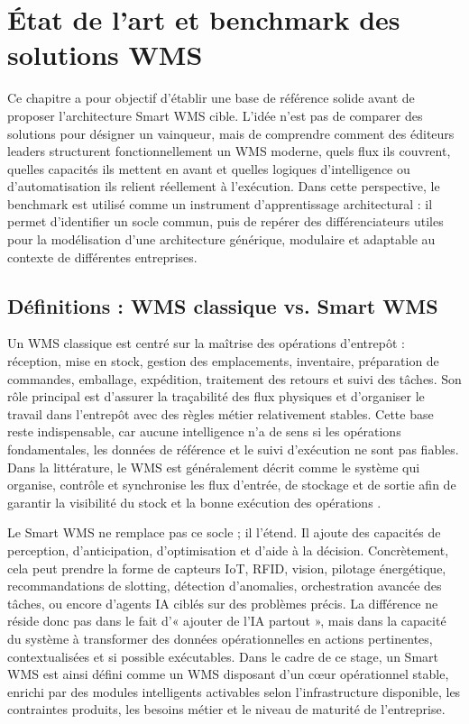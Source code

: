 \chapter{État de l’art et benchmark des solutions WMS}

\label{chap:2}

Ce chapitre a pour objectif d’établir une base de référence solide avant de proposer l’architecture Smart WMS cible. L’idée n’est pas de comparer des solutions pour désigner un vainqueur, mais de comprendre comment des éditeurs leaders structurent fonctionnellement un WMS moderne, quels flux ils couvrent, quelles capacités ils mettent en avant et quelles logiques d’intelligence ou d’automatisation ils relient réellement à l’exécution. Dans cette perspective, le benchmark est utilisé comme un instrument d’apprentissage architectural : il permet d’identifier un socle commun, puis de repérer des différenciateurs utiles pour la modélisation d’une architecture générique, modulaire et adaptable au contexte de différentes entreprises.



\section{Définitions : WMS classique vs. Smart WMS}

\label{sec:2.1}

Un WMS classique est centré sur la maîtrise des opérations d’entrepôt : réception, mise en stock, gestion des emplacements, inventaire, préparation de commandes, emballage, expédition, traitement des retours et suivi des tâches. Son rôle principal est d’assurer la traçabilité des flux physiques et d’organiser le travail dans l’entrepôt avec des règles métier relativement stables. Cette base reste indispensable, car aucune intelligence n’a de sens si les opérations fondamentales, les données de référence et le suivi d’exécution ne sont pas fiables. Dans la littérature, le WMS est généralement décrit comme le système qui organise, contrôle et synchronise les flux d’entrée, de stockage et de sortie afin de garantir la visibilité du stock et la bonne exécution des opérations \cite{ref3}.


Le Smart WMS ne remplace pas ce socle ; il l’étend. Il ajoute des capacités de perception, d’anticipation, d’optimisation et d’aide à la décision. Concrètement, cela peut prendre la forme de capteurs IoT, RFID, vision, pilotage énergétique, recommandations de slotting, détection d’anomalies, orchestration avancée des tâches, ou encore d’agents IA ciblés sur des problèmes précis. La différence ne réside donc pas dans le fait d’« ajouter de l’IA partout », mais dans la capacité du système à transformer des données opérationnelles en actions pertinentes, contextualisées et si possible exécutables. Dans le cadre de ce stage, un Smart WMS est ainsi défini comme un WMS disposant d’un cœur opérationnel stable, enrichi par des modules intelligents activables selon l’infrastructure disponible, les contraintes produits, les besoins métier et le niveau de maturité de l’entreprise.


